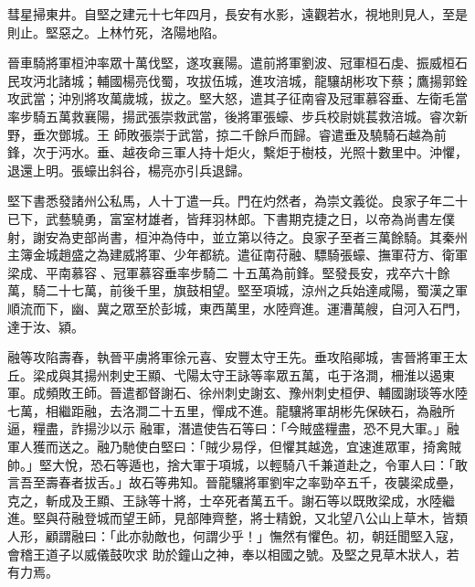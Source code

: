 \begin{pinyinscope}
 彗星掃東井。自堅之建元十七年四月，長安有水影，遠觀若水，視地則見人，至是則止。堅惡之。上林竹死，洛陽地陷。



 晉車騎將軍桓沖率眾十萬伐堅，遂攻襄陽。遣前將軍劉波、冠軍桓石虔、振威桓石民攻沔北諸城；輔國楊亮伐蜀，攻拔伍城，進攻涪城，龍驤胡彬攻下蔡；鷹揚郭銓攻武當；沖別將攻萬歲城，拔之。堅大怒，遣其子征南睿及冠軍慕容垂、左衛毛當率步騎五萬救襄陽，揚武張崇救武當，後將軍張蠔、步兵校尉姚萇救涪城。睿次新野，垂次鄧城。王
 師敗張崇于武當，掠二千餘戶而歸。睿遣垂及驍騎石越為前鋒，次于沔水。垂、越夜命三軍人持十炬火，繫炬于樹枝，光照十數里中。沖懼，退還上明。張蠔出斜谷，楊亮亦引兵退歸。



 堅下書悉發諸州公私馬，人十丁遣一兵。門在灼然者，為崇文義從。良家子年二十已下，武藝驍勇，富室材雄者，皆拜羽林郎。下書期克捷之日，以帝為尚書左僕射，謝安為吏部尚書，桓沖為侍中，並立第以待之。良家子至者三萬餘騎。其秦州主簿金城趙盛之為建威將軍、少年都統。遣征南苻融、驃騎張蠔、撫軍苻方、衛軍梁成、平南慕容、冠軍慕容垂率步騎二
 十五萬為前鋒。堅發長安，戎卒六十餘萬，騎二十七萬，前後千里，旗鼓相望。堅至項城，涼州之兵始達咸陽，蜀漢之軍順流而下，幽、冀之眾至於彭城，東西萬里，水陸齊進。運漕萬艘，自河入石門，達于汝、潁。



 融等攻陷壽春，執晉平虜將軍徐元喜、安豐太守王先。垂攻陷鄖城，害晉將軍王太丘。梁成與其揚州刺史王顯、弋陽太守王詠等率眾五萬，屯于洛澗，柵淮以遏東軍。成頻敗王師。晉遣都督謝石、徐州刺史謝玄、豫州刺史桓伊、輔國謝琰等水陸七萬，相繼距融，去洛澗二十五里，憚成不進。龍驤將軍胡彬先保硤石，為融所逼，糧盡，詐揚沙以示
 融軍，潛遣使告石等曰：「今賊盛糧盡，恐不見大軍。」融軍人獲而送之。融乃馳使白堅曰：「賊少易俘，但懼其越逸，宜速進眾軍，掎禽賊帥。」堅大悅，恐石等遁也，捨大軍于項城，以輕騎八千兼道赴之，令軍人曰：「敢言吾至壽春者拔舌。」故石等弗知。晉龍驤將軍劉牢之率勁卒五千，夜襲梁成壘，克之，斬成及王顯、王詠等十將，士卒死者萬五千。謝石等以既敗梁成，水陸繼進。堅與苻融登城而望王師，見部陣齊整，將士精銳，又北望八公山上草木，皆類人形，顧謂融曰：「此亦勍敵也，何謂少乎！」憮然有懼色。初，朝廷聞堅入寇，會稽王道子以威儀鼓吹求
 助於鐘山之神，奉以相國之號。及堅之見草木狀人，若有力焉。




\end{pinyinscope}
